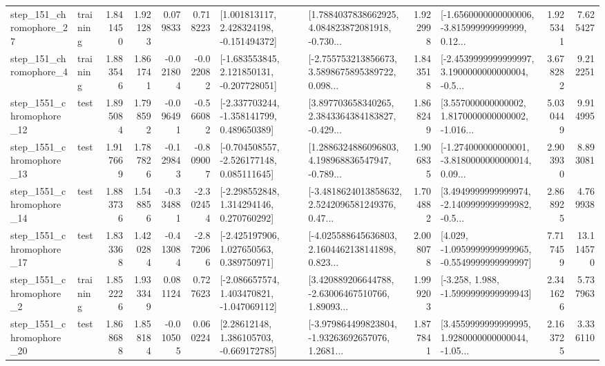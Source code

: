 \begin{tabular}{llrrrrllrlrr}
  step\_151\_chromophore\_27 &  training &      1.841450 &    1.921283 &      0.079833 &  0.718223 &    [1.001813117, 2.428324198, -0.151494372] &  [1.7884037838662925, 4.084823872081918, -0.730... &       1.922998 &  [-1.6560000000000006, -3.815999999999999, 0.12... &            1.925341 &          7.625427 \\
   step\_151\_chromophore\_4 &  training &      1.883546 &    1.861741 &     -0.021804 & -0.022082 &   [-1.683553845, 2.121850131, -0.207728051] &  [-2.755753213856673, 3.5898675895389722, 0.098... &       1.843518 &  [-2.4539999999999997, 3.1900000000000004, -0.5... &            3.678282 &          9.212251 \\
 step\_1551\_chromophore\_12 &      test &      1.895084 &    1.798592 &     -0.096491 & -0.566082 &   [-2.337703244, -1.358141799, 0.489650389] &  [3.897703658340265, 2.3843364384183827, -0.429... &       1.868249 &  [3.557000000000002, 1.8170000000000002, -1.016... &            5.030449 &          9.914995 \\
 step\_1551\_chromophore\_13 &      test &      1.917669 &    1.787826 &     -0.129843 & -0.809007 &   [-0.704508557, -2.526177148, 0.085111645] &  [1.2886324886096803, 4.198968836547947, -0.789... &       1.906835 &  [-1.274000000000001, -3.8180000000000014, 0.09... &            2.903930 &          8.893081 \\
 step\_1551\_chromophore\_14 &      test &      1.883736 &    1.548856 &     -0.334881 & -2.302454 &    [-2.298552848, 1.314294146, 0.270760292] &  [-3.4818624013858632, 2.5242096581249376, 0.47... &       1.704882 &  [3.4949999999999974, -2.1409999999999982, -0.5... &            2.868925 &          4.769938 \\
 step\_1551\_chromophore\_17 &      test &      1.833368 &    1.420284 &     -0.413084 & -2.872066 &    [-2.425197906, 1.027650563, 0.389750971] &  [-4.025588645636803, 2.1604462138141898, 0.823... &       2.008078 &  [4.029, -1.0959999999999965, -0.5549999999999997] &            7.717459 &         13.114570 \\
  step\_1551\_chromophore\_2 &  training &      1.852226 &    1.933349 &      0.081124 &  0.727623 &   [-2.086657574, 1.403470821, -1.047069112] &  [3.420889206644788, -2.63006467510766, 1.89093... &       1.999203 &               [-3.258, 1.988, -1.5999999999999943] &            2.341626 &          5.737963 \\
 step\_1551\_chromophore\_20 &      test &      1.868688 &    1.858184 &     -0.010505 &  0.060224 &     [2.28612148, 1.386105703, -0.669172785] &  [-3.979864499823804, -1.93263692657076, 1.2681... &       1.877841 &  [3.4559999999999995, 1.9280000000000044, -1.05... &            2.163725 &          3.336110 \\

\end{tabular}
